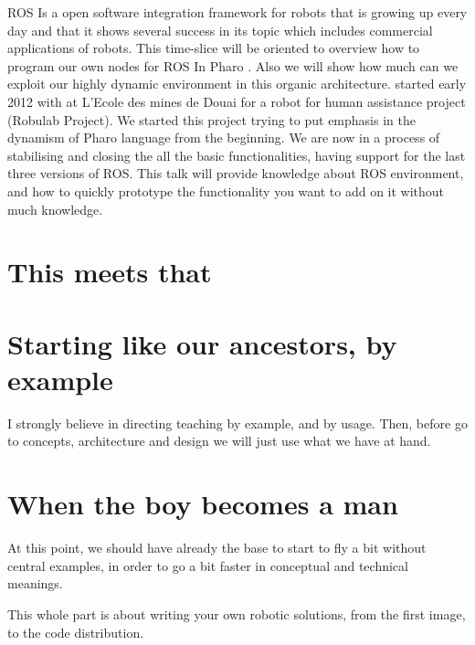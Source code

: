 \documentclass[a4paper,10pt,twoside]{book}
\begin{document}
	
ROS Is a open software integration framework for robots that is growing up every day and that it shows several success in its topic which includes commercial applications of robots. 
This time-slice will be oriented to overview how to program our own nodes for ROS In Pharo . Also we will show how much can we exploit our highly dynamic environment in this organic architecture. 
\fwkName{} started early 2012 with at L'Ecole des mines de Douai for a robot for human assistance project (Robulab Project). We started this project trying to put emphasis in the dynamism of Pharo language from the beginning. We are now in a process of stabilising and closing the all the basic functionalities, having support for the last three versions of ROS. 
This talk will provide knowledge about ROS environment, and how to quickly prototype the functionality you want to add on it without much knowledge.
      


\part{This meets that}

 
 
 

\part{Starting like our ancestors, by example}

I strongly believe in directing teaching by example, and by usage. Then, before go to concepts, architecture and design we will just use what we have at hand. 

 
 
 
 
 

\part{When the boy becomes a man}

At this point, we should have already the base to start to fly a bit without central examples, in order to go a bit faster in conceptual and technical meanings. 	
				
This whole part is about writing your own robotic solutions, from the first image, to the code distribution.
					
					
 
 
 
 
\end{document}
